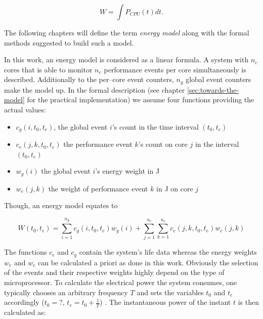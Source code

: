 \begin{equation}
  W = \int P_{CPU}(t)dt.
\end{equation}


\label{sec:model}

The following chapters will define the term \emph{energy model} along with  the
formal methods suggested to build such a model.


\label{sec:model-properties}

In this work, an energy model is considered as a linear formula. A system with
$n_c$ cores that is able to monitor $n_e$ performance events per core
simultaneously is described. Additionally to the per--core event counters, $n_g$
global event counters make the model up. In the formal description (see chapter
\ref{sec:towards-the-model} for the practical implementation) we assume four
functions providing the actual values:

\begin{itemize}

\item $c_g(i, t_0, t_e)$, the global event $i$'s count in the time interval
$(t_0, t_e)$

\item $c_e(j, k, t_0, t_e)$ the performance event $k$'s count on core $j$ in the
interval $(t_0, t_e)$

\item $w_g(i)$ the global event $i$'s energy weight in \si{\joule}

\item $w_e(j, k)$ the weight of performance event $k$ in \si{\joule} on core
$j$

\end{itemize}

Though, an energy model equates to

\begin{equation}
W(t_0, t_e) = \sum\limits_{i=1}^{n_g} c_g(i, t_0, t_e) w_g(i) +
\sum\limits_{j=1}^{n_c} \sum\limits_{k=1}^{n_e} c_e(j, k, t_0, t_e) w_e(j, k)
\end{equation}

The functions $c_e$ and $c_g$ contain the system's life data whereas the energy
weights $w_e$ and $w_c$ can be calculated a priori as done in this work.
Obviously the selection of the events and their respective weights highly depend
on the type of microprocessor. To calculate the electrical power the system
consumes, one typically chooses an arbitrary frequency $T$ and sets
the variables $t_0$ and $t_e$ accordingly ($t_0 = ?$, $t_e = t_0 + \frac{1}{T}$)
. The instantaneous power of the instant $t$ is then calculated as:


